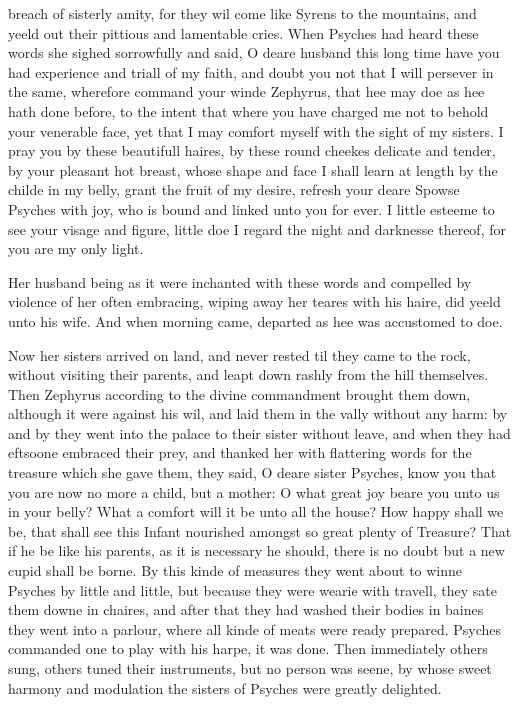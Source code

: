 breach of sisterly amity, for they wil come like Syrens to the mountains, and
yeeld out their pittious and lamentable cries. When Psyches had heard these
words she sighed sorrowfully and said, O deare husband this long time have you
had experience and triall of my faith, and doubt you not that I will persever
in the same, wherefore command your winde Zephyrus, that hee may doe as hee
hath done before, to the intent that where you have charged me not to behold
your venerable face, yet that I may comfort myself with the sight of my
sisters. I pray you by these beautifull haires, by these round cheekes delicate
and tender, by your pleasant hot breast, whose shape and face I shall learn at
length by the childe in my belly, grant the fruit of my desire, refresh your
deare Spowse Psyches with joy, who is bound and linked unto you for ever. I
little esteeme to see your visage and figure, little doe I regard the night and
darknesse thereof, for you are my only light.

Her husband being as it were inchanted with these words and compelled by
violence of her often embracing, wiping away her teares with his haire, did
yeeld unto his wife. And when morning came, departed as hee was accustomed to
doe.

Now her sisters arrived on land, and never rested til they came to the rock,
without visiting their parents, and leapt down rashly from the hill themselves.
Then Zephyrus according to the divine commandment brought them down, although
it were against his wil, and laid them in the vally without any harm: by and by
they went into the palace to their sister without leave, and when they had
eftsoone embraced their prey, and thanked her with flattering words for the
treasure which she gave them, they said, O deare sister Psyches, know you that
you are now no more a child, but a mother: O what great joy beare you unto us
in your belly? What a comfort will it be unto all the house? How happy shall we
be, that shall see this Infant nourished amongst so great plenty of Treasure?
That if he be like his parents, as it is necessary he should, there is no doubt
but a new cupid shall be borne. By this kinde of measures they went about to
winne Psyches by little and little, but because they were wearie with travell,
they sate them downe in chaires, and after that they had washed their bodies in
baines they went into a parlour, where all kinde of meats were ready prepared.
Psyches commanded one to play with his harpe, it was done. Then immediately
others sung, others tuned their instruments, but no person was seene, by whose
sweet harmony and modulation the sisters of Psyches were greatly delighted.

